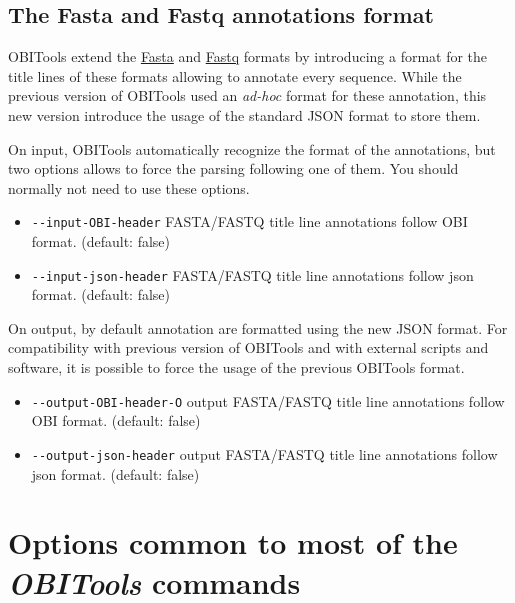 \documentclass[
  letterpaper,
  DIV=11,
  numbers=noendperiod]{scrreprt}
\begin{document}
\hypertarget{the-fasta-and-fastq-annotations-format}{%
\section{The Fasta and Fastq annotations
format}\label{the-fasta-and-fastq-annotations-format}}

OBITools extend the \protect\hyperlink{the-fasta-sequence-format}{Fasta}
and \protect\hyperlink{the-fastq-sequence-format}{Fastq} formats by
introducing a format for the title lines of these formats allowing to
annotate every sequence. While the previous version of OBITools used an
\emph{ad-hoc} format for these annotation, this new version introduce
the usage of the standard JSON format to store them.

On input, OBITools automatically recognize the format of the
annotations, but two options allows to force the parsing following one
of them. You should normally not need to use these options.

\begin{itemize}
\item
  \texttt{-\/-input-OBI-header} FASTA/FASTQ title line annotations
  follow OBI format. (default: false)
\item
  \texttt{-\/-input-json-header} FASTA/FASTQ title line annotations
  follow json format. (default: false)
\end{itemize}

On output, by default annotation are formatted using the new JSON
format. For compatibility with previous version of OBITools and with
external scripts and software, it is possible to force the usage of the
previous OBITools format.

\begin{itemize}
\item
  \texttt{-\/-output-OBI-header\textbar{}-O} output FASTA/FASTQ title
  line annotations follow OBI format. (default: false)
\item
  \texttt{-\/-output-json-header} output FASTA/FASTQ title line
  annotations follow json format. (default: false)
\end{itemize}

\hypertarget{options-common-to-most-of-the-obitools-commands}{%
\chapter{\texorpdfstring{Options common to most of the \emph{OBITools}
commands}{Options common to most of the OBITools commands}}\label{options-common-to-most-of-the-obitools-commands}}
\end{document}

